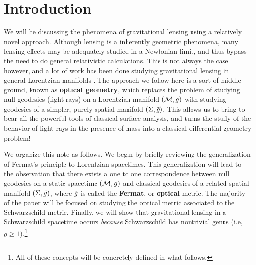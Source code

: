 
\section{Introduction}
We will be discussing the phenomena of gravitational lensing using a relatively novel approach.
Although lensing is a inherently geometric phenomena, many lensing effects may be adequately studied in a Newtonian limit, and thus bypass the need to do general relativistic calculations.
This is not always the case however, and a lot of work has been done studying gravitational lensing in general Lorentzian manifolds \cite{1992grle.book.....S}.
The approach we follow here is a sort of middle ground, known as \textbf{optical geometry}, which replaces the problem of studying null geodesics (light rays) on a Lorentzian manifold $(\mathcal{M}, g)$ with studying geodesics of a simpler, purely spatial manifold $(\Sigma, \tilde{g})$.
This allows us to bring to bear all the powerful tools of classical surface analysis, and turns the study of the behavior of light rays in the presence of mass into a classical differential geometry problem!

We organize this note as follows.
We begin by briefly reviewing the generalization of Fermat's principle to Lorentzian spacetimes.
This generalization will lead to the observation that there exists a one to one correspondence between null geodesics on a static spacetime $(\mathcal{M}, g)$ and classical geodesics of a related spatial manifold $(\Sigma, \tilde{g})$, where $\tilde{g}$ is called the \textbf{Fermat}, or \textbf{optical} metric.
The majority of the paper will be focused on studying the optical metric associated to the Schwarzschild metric.
Finally, we will show that gravitational lensing in a Schwarzschild spacetime occurs \textit{because} Schwarzschild has nontrivial genus (i.e, $g \ge 1$).\footnote{All of these concepts will be concretely defined in what follows.}


